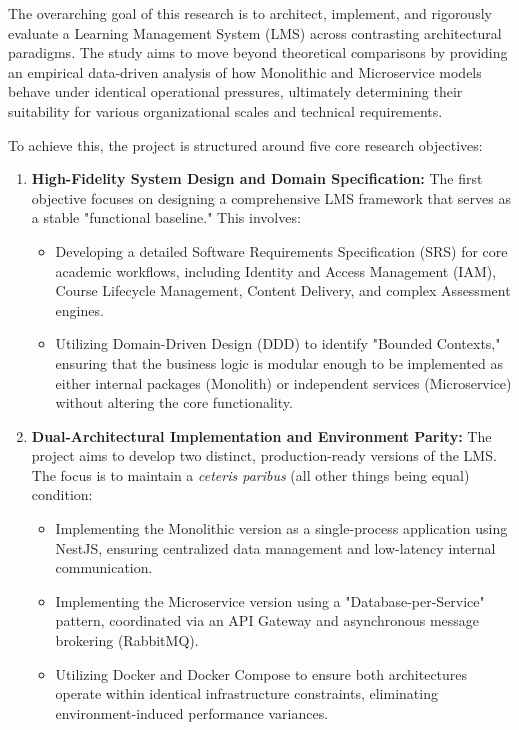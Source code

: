The overarching goal of this research is to architect, implement, and rigorously evaluate a Learning Management System (LMS) across contrasting architectural paradigms. The study aims to move beyond theoretical comparisons by providing an empirical data-driven analysis of how Monolithic and Microservice models behave under identical operational pressures, ultimately determining their suitability for various organizational scales and technical requirements.

To achieve this, the project is structured around five core research objectives:

\begin{enumerate}
\item \textbf{High-Fidelity System Design and Domain Specification:}
The first objective focuses on designing a comprehensive LMS framework that serves as a stable "functional baseline." This involves:
\begin{itemize}
\item Developing a detailed Software Requirements Specification (SRS) for core academic workflows, including Identity and Access Management (IAM), Course Lifecycle Management, Content Delivery, and complex Assessment engines.
\item Utilizing Domain-Driven Design (DDD) to identify "Bounded Contexts," ensuring that the business logic is modular enough to be implemented as either internal packages (Monolith) or independent services (Microservice) without altering the core functionality.
\end{itemize}

\item \textbf{Dual-Architectural Implementation and Environment Parity:}
The project aims to develop two distinct, production-ready versions of the LMS. The focus is to maintain a \textit{ceteris paribus} (all other things being equal) condition:
\begin{itemize}
    \item Implementing the Monolithic version as a single-process application using NestJS, ensuring centralized data management and low-latency internal communication.
    \item Implementing the Microservice version using a "Database-per-Service" pattern, coordinated via an API Gateway and asynchronous message brokering (RabbitMQ).
    \item Utilizing Docker and Docker Compose to ensure both architectures operate within identical infrastructure constraints, eliminating environment-induced performance variances.
\end{itemize}


\end{enumerate}

